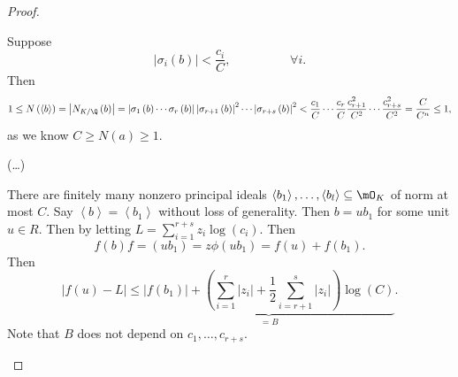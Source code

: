 \documentclass[pmath441]{subfiles}
\begin{document}
\begin{proof}
\begin{claim}
            Suppose
            \begin{equation*}
                \left| \sigma_i\left( b \right) \right| < \frac{c_i}{C}, \hspace{2cm}\forall i.
            \end{equation*}
            Then
            \begin{equation*}
                1 \leq N\left( \left< b \right>  \right) = \left| N_{K /\Q}\left( b \right) \right| = \left| \sigma_1\left( b \right)\cdots\sigma_r\left( b \right) \right|\left| \sigma_{r+1}\left( b \right) \right|^{2}\cdots\left| \sigma_{r+s}\left( b \right) \right|^{2} < \frac{c_1}{C}\cdots \frac{c_r}{C} \frac{c_{r+1}^{2}}{C^{2}}\cdots \frac{c_{r+s}^{2}}{C^{2}} = \frac{C}{C^n} \leq 1,
            \end{equation*}
            as we know $C\geq N\left( a \right)\geq 1$. 

            (\ldots)

            There are finitely many nonzero principal ideals $\left< b_1 \right>,\ldots,\left< b_l \right>\subseteq\mO_K$ of norm at most $C$. Say $\left< b \right> = \left< b_1 \right>$ without loss of generality. Then $b=ub_1$ for some unit $u\in R$. Then by letting $L=\sum^{r+s}_{i=1}z_i\log\left( c_i \right)$. Then
            \begin{equation*}
                f\left( b \right) f=\left( ub_1 \right) = z\phi\left( ub_1 \right) = f\left( u \right)+f\left( b_1 \right).
            \end{equation*}
            Then
            \begin{equation*}
                \left| f\left( u \right)-L \right| \leq \underbrace{\left| f\left( b_1 \right) \right| + \left( \sum^{r}_{i=1}\left| z_i \right|+\frac{1}{2}\sum^{s}_{i=r+1}\left| z_i \right| \right)\log\left( C \right)}_{=B}.
            \end{equation*}
            Note that $B$ does not depend on $c_1,\ldots,c_{r+s}$.
        \end{claim}
    \end{proof}
\end{document}

